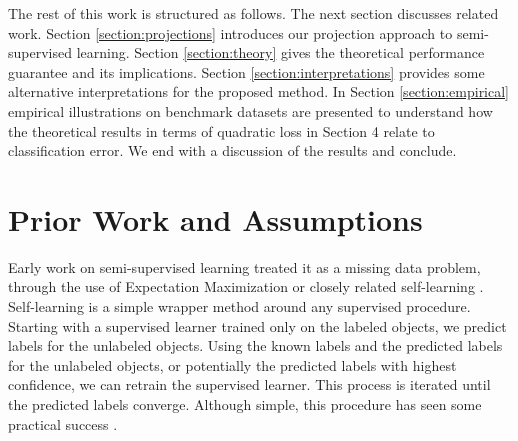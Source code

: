 \documentclass{article}
\begin{document}
The rest of this work is structured as follows. The next section discusses related work. Section \ref{section:projections} introduces our projection approach to semi-supervised learning. Section \ref{section:theory} gives the theoretical performance guarantee and its implications. Section \ref{section:interpretations} provides some alternative interpretations for the proposed method. In Section \ref{section:empirical} empirical illustrations on benchmark datasets are presented to understand how the theoretical results in terms of quadratic loss in Section 4 relate to classification error. We end with a discussion of the results and conclude.

\section{Prior Work and Assumptions}

Early work on semi-supervised learning treated it as a missing data problem, through the use of Expectation Maximization or closely related self-learning \citep{McLachlan1975}. Self-learning is a simple wrapper method around any supervised procedure. Starting with a supervised learner trained only on the labeled objects, we predict labels for the unlabeled objects. Using the known labels and the predicted labels for the unlabeled objects, or potentially the predicted labels with highest confidence, we can retrain the supervised learner. This process is iterated until the predicted labels converge. Although simple, this procedure has seen some practical success \citep{Nigam2000}.
\end{document}

